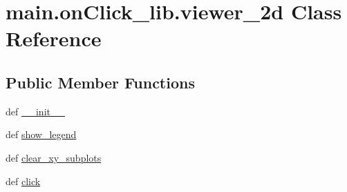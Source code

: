 \hypertarget{classmain_1_1on_click__lib_1_1viewer__2d}{\section{main.\-on\-Click\-\_\-lib.\-viewer\-\_\-2d Class Reference}
\label{classmain_1_1on_click__lib_1_1viewer__2d}
}
\subsection*{Public Member Functions}
\begin{DoxyCompactItemize}
\item 
def \hyperlink{classmain_1_1on_click__lib_1_1viewer__2d_a1e148d2c19fbe9c112ebfdc3bdf2050f}{\-\_\-\-\_\-init\-\_\-\-\_\-}
\item 
def \hyperlink{classmain_1_1on_click__lib_1_1viewer__2d_a666bacd6afb71af7b747551e52c288b3}{show\-\_\-legend}
\item 
def \hyperlink{classmain_1_1on_click__lib_1_1viewer__2d_a6752be12ed5a24d9a585bb247582c3d8}{clear\-\_\-xy\-\_\-subplots}
\item 
def \hyperlink{classmain_1_1on_click__lib_1_1viewer__2d_ab107c07c7abfaf157cac6b38f6a083c4}{click}
\end{DoxyCompactItemize}
